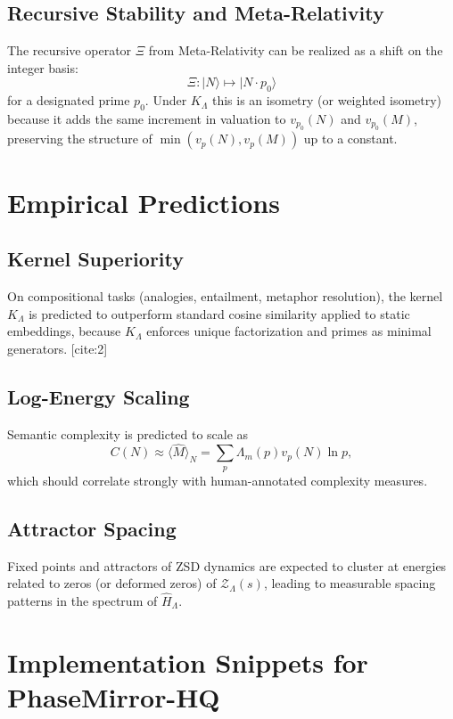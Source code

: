 \documentclass[11pt]{article}
\begin{document}
\subsection{Recursive Stability and Meta-Relativity}

The recursive operator $\Xi$ from Meta-Relativity can be realized
as a shift on the integer basis:
\[
  \Xi : |N\rangle \mapsto |N \cdot p_0\rangle
\]
for a designated prime $p_0$. Under $K_{\Lambda}$ this is an isometry
(or weighted isometry) because it adds the same increment in valuation
to $v_{p_0}(N)$ and $v_{p_0}(M)$, preserving the structure of
$\min(v_p(N), v_p(M))$ up to a constant.

\section{Empirical Predictions}

\subsection{Kernel Superiority}

On compositional tasks (analogies, entailment, metaphor resolution),
the kernel $K_{\Lambda}$ is predicted to outperform standard cosine
similarity applied to static embeddings, because $K_{\Lambda}$ enforces
unique factorization and primes as minimal generators. [cite:2]

\subsection{Log-Energy Scaling}

Semantic complexity is predicted to scale as
\[
  C(N) \approx \langle \hat{M} \rangle_N
    = \sum_{p} \Lambda_m(p) v_p(N) \ln p,
\]
which should correlate strongly with human-annotated complexity
measures.

\subsection{Attractor Spacing}

Fixed points and attractors of ZSD dynamics are expected to cluster
at energies related to zeros (or deformed zeros) of
$\mathcal{Z}_{\Lambda}(s)$, leading to measurable spacing patterns
in the spectrum of $\hat{H}_{\Lambda}$.

\section{Implementation Snippets for PhaseMirror-HQ}
\end{document}
